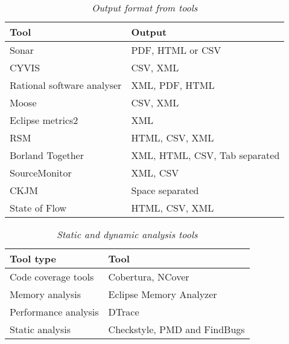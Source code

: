 \begin{table*}[!htb]
\caption{\textit{Output format from tools}}
\centering
\begin{tabular}{|p{6cm}|p{6cm}|} \hline
\textbf{Tool}&\textbf{Output}\\ \hline
Sonar&PDF, HTML or CSV\\ \hline
CYVIS & CSV, XML\\ \hline
Rational software analyser & XML, PDF, HTML \\ \hline
Moose & CSV, XML\\ \hline
Eclipse metrics2 & XML\\ \hline
RSM &HTML, CSV, XML \\ \hline
Borland Together & XML, HTML, CSV, Tab separated\\ \hline
SourceMonitor & XML, CSV\\ \hline
CKJM & Space separated\\ \hline
State of Flow & HTML, CSV, XML\\ 
\hline\end{tabular}
\label{table:outputformat}
\end{table*}

\begin{table*}[!htb]
\caption{\textit{Static and dynamic analysis tools}}
\centering
\begin{tabular}{|p{6cm}|p{6cm}|} \hline
\textbf{Tool type}&\textbf{Tool}\\ \hline
Code coverage tools&Cobertura, NCover \\ \hline
Memory analysis & Eclipse Memory Analyzer\\ \hline
Performance analysis & DTrace \\ \hline
Static analysis & Checkstyle, PMD and FindBugs\\ 
\hline\end{tabular}
\label{table:staticanddynamicanalysis}
\end{table*}



